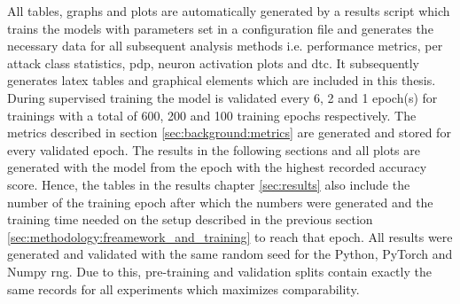 All tables, graphs and plots are automatically generated by a results script which trains the models with parameters set in a configuration file and generates the necessary data for all subsequent analysis methods i.e. performance metrics, per attack class statistics, \gls{pdp}, neuron activation plots and \gls{dtc}. It subsequently generates latex tables and graphical elements which are included in this thesis. During supervised training the model is validated every 6, 2 and 1 epoch(s) for trainings with a total of 600, 200 and 100 training epochs respectively. The metrics described in section \ref{sec:background:metrics} are generated and stored for every validated epoch. The results in the following sections and all plots are generated with the model from the epoch with the highest recorded accuracy score. Hence, the tables in the results chapter \ref{sec:results} also include the number of the training epoch after which the numbers were generated and the training time needed on the setup described in the previous section \ref{sec:methodology:freamework_and_training} to reach that epoch.
All results were generated and validated with the same random seed for the Python, PyTorch and Numpy \gls{rng}. Due to this, pre-training and validation splits contain exactly the same records for all experiments which maximizes comparability. 
\newpage